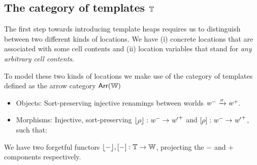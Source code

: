 \subsection[Category of Templates]{The category of templates $\mathbb{T}$}

The first step towards introducing template heaps requires us to distinguish between two different kinds of locations.
We have (i) concrete locations that are associated with some cell contents and 
(ii) location variables that stand for \emph{any arbitrary cell contents}.

To model these two kinds of locations we make use of the category of templates defined as the arrow category $\mathsf{Arr}({\mathbb{W}})$
\begin{itemize}
    \item Objects: Sort-preserving injective renamings between worlds ${\mathit{w}}^- \xrightarrow\sigma {\mathit{w}}^+$.
    \item Morphisms: Injective, sort-preserving $\lfloor\rho\rfloor : {\mathit{w}}^- \to {\mathit{w}'}^+$ and $[\rho] : {\mathit{w}}^- \to {\mathit{w}'}^+$, such that: 
                    \begin{center}
                    \end{center}
\end{itemize}
We have two forgetful functors $\lfloor-\rfloor, [-] : \mathbb{T} \to \mathbb{W}$, projecting the $-$ and $+$ components respectively.

